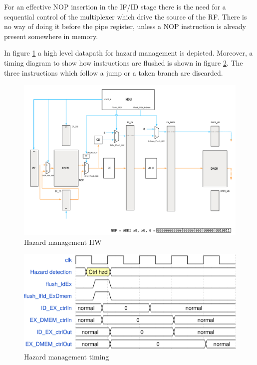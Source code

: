 \documentclass[a4paper]{article}
\begin{document}
For an effective NOP insertion in the IF/ID stage there is the need for a sequential control of the multiplexer which drive the source of the RF. There is no way of doing it before the pipe register, unless a NOP instruction is already present somewhere in memory.

In figure \ref{fig:hzd_management} a high level datapath for hazard management is depicted. Moreover, a timing diagram to show how instructions are flushed is shown in figure \ref{fig:hzd_management_timing}. The three instructions which follow a jump or a taken branch are discarded.

\begin{figure}[hbtp]
    \centering
    \includegraphics[scale=0.5]{../hzd_management/ref/schematic/hzd_management.pdf}
    \caption{Hazard management HW}
    \label{fig:hzd_management}
\end{figure}

\begin{figure}[hbtp]
    \centering
    \includegraphics[scale=0.8]{../hzd_management/ref/timing/hzd_management_timing.png}
    \caption{Hazard management timing}
    \label{fig:hzd_management_timing}
\end{figure}
\end{document}
